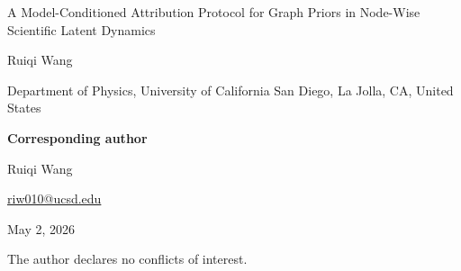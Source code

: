 \documentclass[12pt]{article}
\begin{document}
\begin{center}
{\Large A Model-Conditioned Attribution Protocol for Graph Priors in Node-Wise Scientific Latent Dynamics\par}
\vspace{1.5cm}
{\large Ruiqi Wang\par}
\vspace{0.75cm}
Department of Physics, University of California San Diego, La Jolla, CA, United States
\vspace{1.25cm}

\textbf{Corresponding author}\par
Ruiqi Wang\par
\href{mailto:riw010@ucsd.edu}{riw010@ucsd.edu}
\vspace{1.25cm}

May 2, 2026
\vspace{1.25cm}

The author declares no conflicts of interest.
\end{center}
\end{document}

